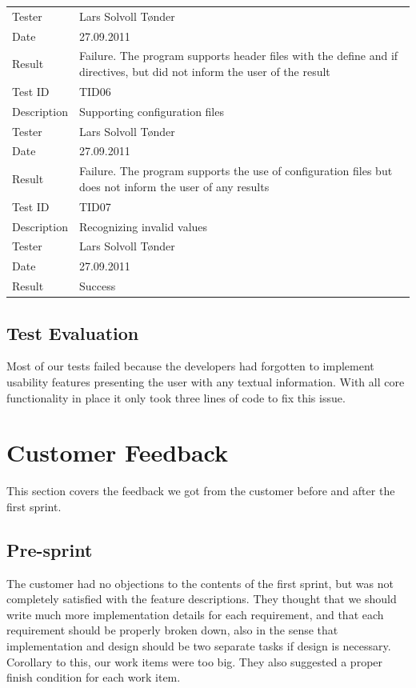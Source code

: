 \begin{table}[!htb]
{\begin{tabularx}{\textwidth}{l X}
	Tester & Lars Solvoll Tønder \\
	Date & 27.09.2011 \\
	Result & Failure. The program supports \gls{header} files with the \gls{define} and \gls{if} directives, but did not inform the user of the result\\
	\midrule
	Test ID & TID06 \\
	Description &  Supporting configuration files  \\
	Tester & Lars Solvoll Tønder \\
	Date & 27.09.2011 \\
	Result & Failure. The program supports the use of configuration files but does not inform the user of any results\\
	\midrule
	Test ID & TID07 \\
	Description &  Recognizing invalid values  \\
	Tester & Lars Solvoll Tønder \\
	Date & 27.09.2011 \\
	Result & Success\\
	\bottomrule
\end{tabularx}}
\end{table}

\subsection{Test Evaluation}
Most of our tests failed because the developers had forgotten to implement
usability features presenting the user with any textual information. With all
core functionality in place it only took three lines of code to fix this issue.


\section{Customer Feedback}
\label{sec:sp1:feedback}
This section covers the feedback we got from the customer before and after the first sprint.

\subsection{Pre-sprint}
The customer had no objections to the contents of the first sprint, but was not
completely satisfied with the feature descriptions. They thought that we should
write much more implementation details for each requirement, and that each
requirement should be properly broken down, also in the sense that
implementation and design should be two separate tasks if design is necessary.
Corollary to this, our work items were too big. They also suggested a proper
finish condition for each work item.

